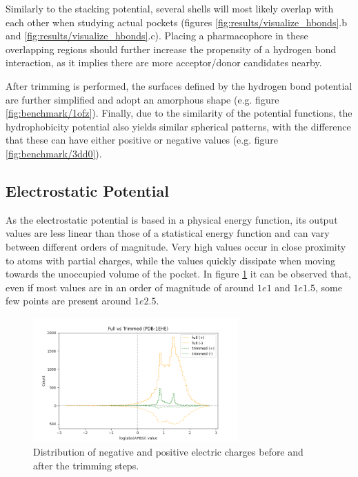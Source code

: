     Similarly to the stacking potential, several shells will most likely overlap with each other when studying actual pockets (figures \ref{fig:results/visualize_hbonds}.b and \ref{fig:results/visualize_hbonds}.c). Placing a pharmacophore in these overlapping regions should further increase the propensity of a hydrogen bond interaction, as it implies there are more acceptor/donor candidates nearby.

    After trimming is performed, the surfaces defined by the hydrogen bond potential are further simplified and adopt an amorphous shape (e.g. figure \ref{fig:benchmark/1ofz}). Finally, due to the similarity of the potential functions, the hydrophobicity potential also yields similar spherical patterns, with the difference that these can have either positive or negative values (e.g. figure \ref{fig:benchmark/3dd0}).

  \subsection{Electrostatic Potential}
    As the electrostatic potential is based in a physical energy function, its output values are less linear than those of a statistical energy function and can vary between different orders of magnitude. Very high values occur in close proximity to atoms with partial charges, while the values quickly dissipate when moving towards the unoccupied volume of the pocket. In figure \ref{fig:results/logapbs_trimming} it can be observed that, even if most values are in an order of magnitude of around $1e1$ and $1e1.5$, some few points are present around $1e2.5$.

    \begin{figure}[H]
      \centering
      \includegraphics[width=0.7\textwidth]{figures/results/logapbs_trimming.png}
      \caption{\label{fig:results/logapbs_trimming} Distribution of negative and positive electric charges before and after the trimming steps.}
    \end{figure}

